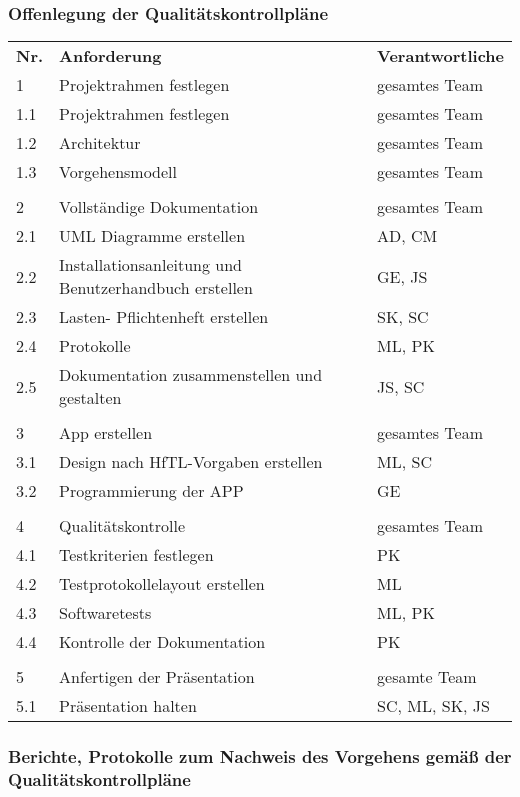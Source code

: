 \subsubsection{Offenlegung der Qualitätskontrollpläne}

\begin{tabular}{lll}
	\textbf{Nr.} & \textbf{Anforderung} & \textbf{Verantwortliche} \\
	1 & Projektrahmen festlegen & gesamtes Team \\
	1.1 & Projektrahmen festlegen & gesamtes Team \\
	1.2 & Architektur & gesamtes Team \\
	1.3 & Vorgehensmodell & gesamtes Team \\
	\\
	2 & Vollständige Dokumentation & gesamtes Team \\
	2.1 & UML Diagramme erstellen & AD, CM \\
	2.2 & Installationsanleitung und Benutzerhandbuch erstellen & GE, JS \\
	2.3 & Lasten- Pflichtenheft erstellen & SK, SC \\
	2.4 & Protokolle & ML, PK \\
	2.5 & Dokumentation zusammenstellen und gestalten & JS, SC \\
	\\
	3 & App erstellen & gesamtes Team \\
	3.1 & Design nach HfTL-Vorgaben erstellen & ML, SC \\
	3.2 & Programmierung der APP & GE \\	
	\\
	4 & Qualitätskontrolle & gesamtes Team \\
	4.1 & Testkriterien festlegen & PK \\
	4.2 & Testprotokollelayout erstellen & ML \\
	4.3 & Softwaretests & ML, PK \\
	4.4 & Kontrolle der Dokumentation & PK \\
	\\
	5 & Anfertigen der Präsentation & gesamte Team \\
	5.1 & Präsentation halten & SC, ML, SK, JS \\
\end{tabular}



\subsubsection{Berichte, Protokolle zum Nachweis des Vorgehens gemäß der Qualitätskontrollpläne}

